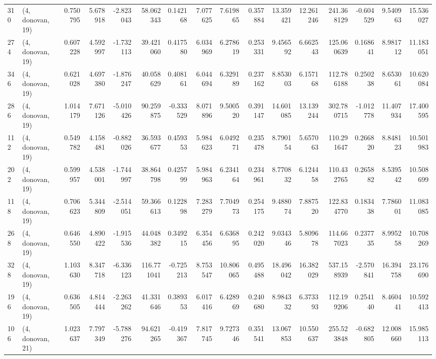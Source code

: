 \begin{tabular}{llrrrrrrrrrrrrrr}
310 &  (4, donovan, 19) &   0.750795 &   5.678918 &  -2.823043 &    58.062343 &   0.142168 &   7.077625 &   7.619865 &  0.357884 &  13.359421 &  12.261246 &    241.368129 &   -0.604529 &    9.540963 &   15.536027 \\
274 &  (4, donovan, 19) &   0.607228 &   4.592997 &  -1.732113 &    39.421060 &   0.417580 &   6.034969 &   6.278619 &  0.253331 &   9.456592 &   6.662543 &    125.060639 &    0.168641 &    8.981712 &   11.183051 \\
346 &  (4, donovan, 19) &   0.621028 &   4.697380 &  -1.876247 &    40.058629 &   0.408161 &   6.044694 &   6.329189 &  0.237162 &   8.853003 &   6.157168 &    112.786188 &    0.250238 &    8.653061 &   10.620084 \\
286 &  (4, donovan, 19) &   1.014179 &   7.671126 &  -5.010426 &    90.259875 &  -0.333529 &   8.071896 &   9.500520 &  0.391147 &  14.601085 &  13.139244 &    302.780715 &   -1.012778 &   11.407934 &   17.400595 \\
112 &  (4, donovan, 19) &   0.549782 &   4.158481 &  -0.882026 &    36.593677 &   0.459353 &   5.984623 &   6.049271 &  0.235478 &   8.790154 &   5.657063 &    110.291647 &    0.266820 &    8.848123 &   10.501983 \\
202 &  (4, donovan, 19) &   0.599957 &   4.538001 &  -1.744997 &    38.864798 &   0.425799 &   5.984963 &   6.234164 &  0.234961 &   8.770832 &   6.124458 &    110.432765 &    0.265882 &    8.539542 &   10.508699 \\
118 &  (4, donovan, 19) &   0.706623 &   5.344809 &  -2.514051 &    59.366613 &   0.122898 &   7.283279 &   7.704973 &  0.254175 &   9.488074 &   7.887520 &    122.834770 &    0.183438 &    7.786001 &   11.083085 \\
268 &  (4, donovan, 19) &   0.646550 &   4.890422 &  -1.915536 &    44.048382 &   0.349215 &   6.354456 &   6.636895 &  0.242020 &   9.034346 &   5.809678 &    114.667023 &    0.237735 &    8.995258 &   10.708269 \\
328 &  (4, donovan, 19) &   1.103630 &   8.347718 &  -6.336123 &   116.771041 &  -0.725213 &   8.753547 &  10.806065 &  0.495488 &  18.496042 &  16.382029 &    537.158939 &   -2.570841 &   16.394758 &   23.176690 \\
196 &  (4, donovan, 19) &   0.636505 &   4.814444 &  -2.263262 &    41.331646 &   0.389353 &   6.017416 &   6.428969 &  0.240680 &   8.984332 &   6.373393 &    112.199206 &    0.254140 &    8.460441 &   10.592413 \\
106 &  (4, donovan, 21) &   1.023637 &   7.797349 &  -5.788276 &    94.621265 &  -0.419367 &   7.817745 &   9.727346 &  0.351541 &  13.067853 &  10.550637 &    255.523848 &   -0.682805 &   12.008660 &   15.985113 \\

\end{tabular}
